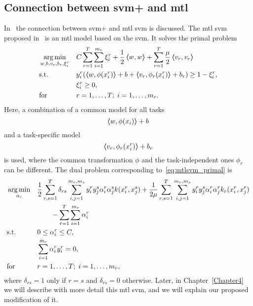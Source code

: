 \subsection{Connection between \acrshort{svm}+ and \acrshort{mtl}}
In~\cite{LiangC08} the connection between \acrshort{svm}+ and \acrshort{mtl} \acrshort{svm} is discussed. 
The \acrshort{mtl} \acrshort{svm} proposed in~\cite{LiangC08} is an \acrshort{mtl} model based on the \acrshort{svm}.
%
It solves the primal problem
\begin{equation}
    \label{eq:mtlsvm_primal}
    \begin{aligned}
        & \argmin_{w, b, v_r, b_r, \xi_i^r}
        & & C \sum_{r=1}^\ntasks \sum_{i=1}^{\npertask_r} \xi_i^r + \frac{1}{2} \dotp{w}{w} + \sum_{r=1}^\ntasks \frac{\mu}{2} \dotp{v_r}{v_r} \\
        & \text{s.t.}
        & & y_{i}^r ( \dotp{w}{\phi(x_{i}^r)} + b + \dotp{v_r}{\phi_r(x_{i}^r)} + b_r) \geq 1 - \xi_i^r ,\\
        & & &\xi_i^r \geq 0, \\
        & \text{for } & & r=1, \ldots, \ntasks; \; i=1, \ldots, \npertask_r.
    \end{aligned}
\end{equation}
Here, a combination of a common model for all tasks
$$ \bm{\left\langle} w, \phi(x_{i}) \bm{\right\rangle} + b $$
and a task-specific model
$$ \bm{\left\langle} v_r, \phi_r(x_{i}^r) \bm{\right\rangle} + b_r $$
is used, where the common transformation $\phi$ and the task-independent ones $\phi_r$ can be different.
The dual problem corresponding to~\eqref{eq:mtlsvm_primal} is
\begin{equation}\label{eq:mtlsvm_dual}
    \begin{aligned}
        & \argmin_{\alpha_i} 
        & & \frac{1}{2} \sum_{r, s=1}^\ntasks \delta_{rs} \sum_{i, j=1}^{\npertask_r, \npertask_s} y_i^r y_j^s \alpha_i^r \alpha_j^s k(x_i^r, x_j^s) + \frac{1}{2 \mu} \sum_{r,s=1}^\ntasks  \sum_{i, j=1}^{\npertask_r, \npertask_s}  y_i^r y_j^s \alpha_i^r \alpha_j^r k_r(x^r_i, x^r_j) \\
        & & & \qquad - \sum_{r=1}^\ntasks \sum_{i=1}^{\npertask_r} \alpha_i^r \\
        & \text{s.t.}
        & & 0 \leq \alpha_i^r \leq C ,\\
        & & & \sum_{i=1}^{\npertask_r}{\alpha_i^r y_i^r} = 0, \\
        & \text{for } & & r=1, \ldots, \ntasks; \; i=1, \ldots, \npertask_r ,
        \end{aligned}
\end{equation}
where $\delta_{rs} = 1$ only if $r=s$ and $\delta_{rs} = 0$ otherwise.
Later, in Chapter~\ref{Chapter4} we will describe with more detail this \acrshort{mtl} \acrshort{svm}, and we will explain our proposed modification of it.

